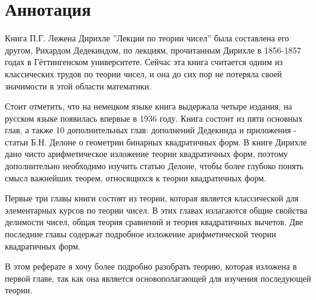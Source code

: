 \chapter{Аннотация}

Книга П.Г. Лежена Дирихле ”Лекции по теории чисел” была составлена его другом, Рихардом Дедекиндом, по лекциям, прочитанным Дирихле в 1856-1857 годах в Гёттингенском университете. Сейчас эта книга считается одним из классических трудов по теории чисел, и она до сих пор не потеряла своей значимости в этой области математики.

Стоит отметить, что на немецком языке книга выдержала четыре издания, на русском языке появилась впервые в 1936 году. Книга состоит из пяти основных глав, а также 10 дополнительных глав: дополнений Дедекинда и приложения - статьи Б.Н. Делоне о геометрии бинарных квадратичных форм. В книге Дирихле дано чисто арифметическое изложение теории квадратичных форм, поэтому дополнительно необходимо изучить статью Делоне, чтобы более глубоко понять смысл важнейших теорем, относящихся к теории квадратичных форм.

Первые три главы книги состоят из теории, которая является классической для элементарных курсов по теории чисел. В этих главах излагаются общие свойства делимости чисел, общая теория сравнений и теория квадратичных вычетов. Две последние главы содержат подробное изложение арифметической теории квадратичных форм. 

В этом реферате я хочу более подробно разобрать теорию, которая изложена в первой главе, так как она является основополагающей для изучения последующей теории.
